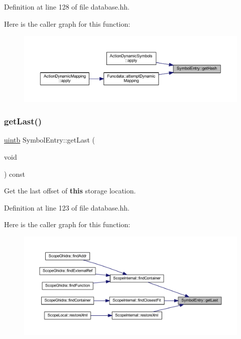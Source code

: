 Definition at line 128 of file database.\+hh.

Here is the caller graph for this function\+:
\nopagebreak
\begin{figure}[H]
\begin{center}
\leavevmode
\includegraphics[width=350pt]{class_symbol_entry_a1ed6804fa8944007d6e0685432dced73_icgraph}
\end{center}
\end{figure}
\mbox{\label{class_symbol_entry_acda4239e668f63bfb99c89a347d6b024}} 
\subsubsection{\texorpdfstring{getLast()}{getLast()}}
{\footnotesize\ttfamily \mbox{\hyperlink{types_8h_a2db313c5d32a12b01d26ac9b3bca178f}{uintb}} Symbol\+Entry\+::get\+Last (\begin{DoxyParamCaption}\item[{void}]{ }\end{DoxyParamCaption}) const\hspace{0.3cm}{\ttfamily [inline]}}



Get the last offset of {\bfseries{this}} storage location. 



Definition at line 123 of file database.\+hh.

Here is the caller graph for this function\+:
\nopagebreak
\begin{figure}[H]
\begin{center}
\leavevmode
\includegraphics[width=350pt]{class_symbol_entry_acda4239e668f63bfb99c89a347d6b024_icgraph}
\end{center}
\end{figure}
\mbox{\label{class_symbol_entry_a79274b1741dc33bbc57d5667b4df4eae}} 
